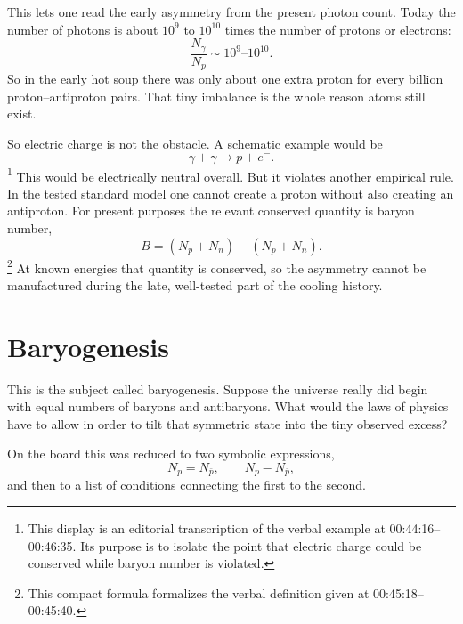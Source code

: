 This lets one read the early asymmetry from the present photon count. Today the number of photons is about \(10^9\) to \(10^{10}\) times the number of protons or electrons:
\[
\frac{N_\gamma}{N_p} \sim 10^9\text{--}10^{10}.
\]
So in the early hot soup there was only about one extra proton for every billion proton--antiproton pairs. That tiny imbalance is the whole reason atoms still exist.

\begin{classroomqa}
\end{classroomqa}

So electric charge is not the obstacle. A schematic example would be
\[
\gamma + \gamma \to p + e^-.
\]\footnote{This display is an editorial transcription of the verbal example at 00:44:16--00:46:35. Its purpose is to isolate the point that electric charge could be conserved while baryon number is violated.}
This would be electrically neutral overall. But it violates another empirical rule. In the tested standard model one cannot create a proton without also creating an antiproton. For present purposes the relevant conserved quantity is baryon number,
\[
B=(N_p+N_n)-(N_{\bar p}+N_{\bar n}).
\]\footnote{This compact formula formalizes the verbal definition given at 00:45:18--00:45:40.}
At known energies that quantity is conserved, so the asymmetry cannot be manufactured during the late, well-tested part of the cooling history.

\section{Baryogenesis}

This is the subject called baryogenesis. Suppose the universe really did begin with equal numbers of baryons and antibaryons. What would the laws of physics have to allow in order to tilt that symmetric state into the tiny observed excess?

On the board this was reduced to two symbolic expressions,
\[
N_p=N_{\bar p},
\qquad
N_p-N_{\bar p},
\]
and then to a list of conditions connecting the first to the second.

